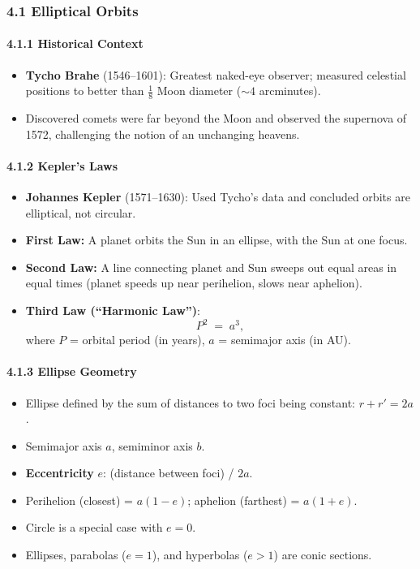 \subsubsection{4.1 Elliptical Orbits}

\paragraph{4.1.1 Historical Context}
\begin{itemize}
  \item \textbf{Tycho Brahe} (1546--1601): Greatest naked-eye observer; measured celestial positions to better than $\frac{1}{8}$ Moon diameter ($\sim 4$ arcminutes).
  \item Discovered comets were far beyond the Moon and observed the supernova of 1572, challenging the notion of an unchanging heavens.
\end{itemize}

\paragraph{4.1.2 Kepler’s Laws}
\begin{itemize}
  \item \textbf{Johannes Kepler} (1571--1630): Used Tycho’s data and concluded orbits are elliptical, not circular.
  \item \textbf{First Law:} A planet orbits the Sun in an ellipse, with the Sun at one focus.
  \item \textbf{Second Law:} A line connecting planet and Sun sweeps out equal areas in equal times (planet speeds up near perihelion, slows near aphelion).
  \item \textbf{Third Law (``Harmonic Law'')}:
  \[
    P^2 \;=\; a^3,
  \]
  where $P$ = orbital period (in years), $a$ = semimajor axis (in AU).
\end{itemize}

\paragraph{4.1.3 Ellipse Geometry}
\begin{itemize}
  \item Ellipse defined by the sum of distances to two foci being constant: $r + r' = 2a$.
  \item Semimajor axis $a$, semiminor axis $b$.
  \item \textbf{Eccentricity} $e$: (distance between foci) / $2a$.
  \item Perihelion (closest) = $a(1 - e)$; aphelion (farthest) = $a(1 + e)$.
  \item Circle is a special case with $e=0$.
  \item Ellipses, parabolas ($e=1$), and hyperbolas ($e>1$) are conic sections.
\end{itemize}

